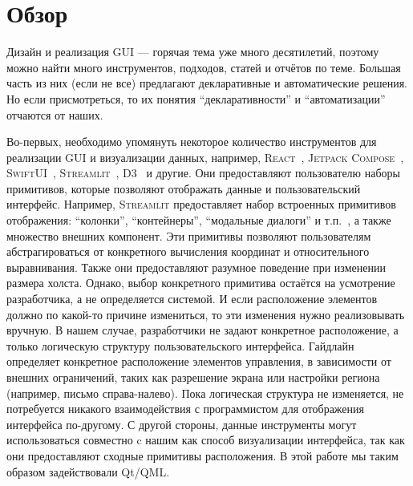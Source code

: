 
\section{Обзор}
\label{related}

Дизайн и реализация GUI --- горячая тема уже много десятилетий, поэтому можно найти много инструментов, подходов, статей и отчётов по теме. Большая часть из них (если не все) предлагают декларативные и автоматические решения. Но если присмотреться, то их понятия \enquote{декларативности} и \enquote{автоматизации} отчаются от наших.


Во-первых, необходимо упомянуть некоторое количество инструментов для реализации GUI и визуализации данных, например,
\textsc{React}~\cite{react},
\textsc{Jetpack Compose}~\cite{Jetpack}, \textsc{SwiftUI}~\cite{SwiftUI}, \textsc{Streamlit}~\cite{Streamlit}, \textsc{D3}~\cite{D3} и другие.
Они предоставляют пользователю наборы примитивов, которые позволяют отображать данные и пользовательский интерфейс. Например, \textsc{Streamlit}
предоставляет набор встроенных примитивов отображения: \enquote{колонки}, \enquote{контейнеры}, \enquote{модальные диалоги} и т.п.~\cite{StreamlitLayout}, а также множество внешних компонент. Эти примитивы позволяют пользователям абстрагироваться от конкретного вычисления координат и относительного выравнивания. Также они предоставляют разумное поведение при изменении размера холста. Однако, выбор конкретного примитива остаётся на усмотрение разработчика, а не определяется системой.
И если расположение элементов должно по какой-то причине измениться, то эти изменения нужно реализовывать вручную. В нашем случае, разработчики не задают конкретное расположение, а только логическую структуру пользовательского интерфейса. Гайдлайн определяет конкретное расположение элементов управления,
в зависимости от внешних ограничений, таких как разрешение экрана или настройки региона (например, письмо справа-налево). Пока логическая структура не изменяется,
не потребуется никакого взаимодействия с программистом для отображения интерфейса по-другому. С другой стороны, данные инструменты могут использоваться совместно c нашим как способ визуализации интерфейса, так как они предоставляют сходные примитивы расположения. В этой работе мы таким образом задействовали Qt/QML.

